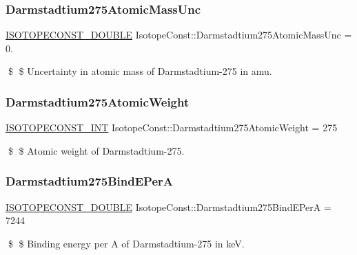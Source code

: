 \subsubsection{\texorpdfstring{Darmstadtium275\+Atomic\+Mass\+Unc}{Darmstadtium275AtomicMassUnc}}
{\footnotesize\ttfamily \mbox{\hyperlink{group___isotope_const-_macros_ga8f45a7272ce02c0b4c65c44636ed719a}{I\+S\+O\+T\+O\+P\+E\+C\+O\+N\+S\+T\+\_\+\+D\+O\+U\+B\+LE}} Isotope\+Const\+::\+Darmstadtium275\+Atomic\+Mass\+Unc = 0.}

\$ \$ Uncertainty in atomic mass of Darmstadtium-\/275 in amu. \mbox{\label{group___isotope_const-_darmstadtium-_ds275_gacf664a19ba251e5251252a6789c54dd2}} 
\subsubsection{\texorpdfstring{Darmstadtium275\+Atomic\+Weight}{Darmstadtium275AtomicWeight}}
{\footnotesize\ttfamily \mbox{\hyperlink{group___isotope_const-_macros_ga5f18360b3e99483a35c32d789e62621c}{I\+S\+O\+T\+O\+P\+E\+C\+O\+N\+S\+T\+\_\+\+I\+NT}} Isotope\+Const\+::\+Darmstadtium275\+Atomic\+Weight = 275}

\$ \$ Atomic weight of Darmstadtium-\/275. \mbox{\label{group___isotope_const-_darmstadtium-_ds275_gadd34655672fa75ebf08e4d55c7bc333e}} 
\subsubsection{\texorpdfstring{Darmstadtium275\+Bind\+E\+PerA}{Darmstadtium275BindEPerA}}
{\footnotesize\ttfamily \mbox{\hyperlink{group___isotope_const-_macros_ga8f45a7272ce02c0b4c65c44636ed719a}{I\+S\+O\+T\+O\+P\+E\+C\+O\+N\+S\+T\+\_\+\+D\+O\+U\+B\+LE}} Isotope\+Const\+::\+Darmstadtium275\+Bind\+E\+PerA = 7244}

\$ \$ Binding energy per A of Darmstadtium-\/275 in keV. \mbox{\label{group___isotope_const-_darmstadtium-_ds275_gafb3b9e666cfb82a474b514bbc9efb482}} 
